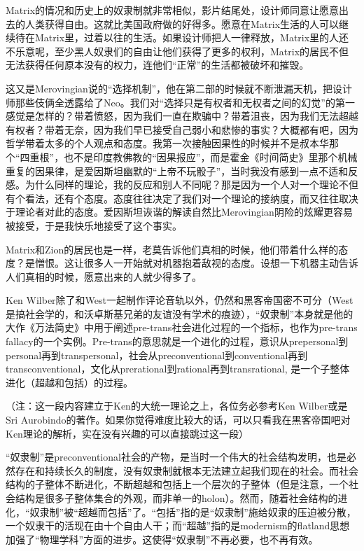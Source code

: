 \documentclass[UTF8]{ctexart}
\begin{document}
Matrix的情况和历史上的奴隶制就非常相似，影片结尾处，设计师同意让愿意出去的人类获得自由。这就比美国政府做的好得多。愿意在Matrix生活的人可以继续待在Matrix里，过着以往的生活。如果设计师把人一律释放，Matrix里的人还不乐意呢，至少黑人奴隶们的自由让他们获得了更多的权利，Matrix的居民不但无法获得任何原本没有的权力，连他们“正常”的生活都被破坏和摧毁。

这又是Merovingian说的“选择机制”，他在第二部的时候就不断泄漏天机，把设计师那些伎俩全透露给了Neo。我们对“选择只是有权者和无权者之间的幻觉”的第一感觉是怎样的？带着愤怒，因为我们一直在欺骗中？带着沮丧，因为我们无法超越有权者？带着无奈，因为我们早已接受自己弱小和悲惨的事实？大概都有吧，因为哲学带着太多的个人观点和态度。我第一次接触因果性的时候并不是叔本华那个“四重根”，也不是印度教佛教的“因果报应”，而是霍金《时间简史》里那个机械重复的因果律，是爱因斯坦幽默的“上帝不玩骰子”，当时我没有感到一点不适和反感。为什么同样的理论，我的反应和别人不同呢？那是因为一个人对一个理论不但有个看法，还有个态度。态度往往决定了我们对一个理论的接纳度，而又往往取决于理论者对此的态度。爱因斯坦诙谐的解读自然比Merovingian阴险的炫耀更容易被接受，于是我快乐地接受了这个事实。

Matrix和Zion的居民也是一样，老莫告诉他们真相的时候，他们带着什么样的态度？是憎恨。这让很多人一开始就对机器抱着敌视的态度。设想一下机器主动告诉人们真相的时候，愿意出来的人就少得多了。

Ken Wilber除了和West一起制作评论音轨以外，仍然和黑客帝国密不可分（West是搞社会学的，和沃卓斯基兄弟的友谊没有学术的痕迹），“奴隶制”本身就是他的大作《万法简史》中用于阐述pre-trans社会进化过程的一个指标，也作为pre-trans fallacy的一个实例。Pre-trans的意思就是一个进化的过程，意识从prepersonal到personal再到transpersonal，社会从preconventional到conventional再到transconventional，文化从prerational到rational再到transrational, 是一个子整体进化（超越和包括）的过程。

（注：这一段内容建立于Ken的大统一理论之上，各位务必参考Ken Wilber或是Sri Aurobindo的著作。如果你觉得难度比较大的话，可以只看我在黑客帝国吧对Ken理论的解析，实在没有兴趣的可以直接跳过这一段）

“奴隶制”是preconventional社会的产物，是当时一个伟大的社会结构发明，也是必然存在和持续长久的制度，没有奴隶制就根本无法建立起我们现在的社会。而社会结构的子整体不断进化，不断超越和包括上一个层次的子整体（但是注意，一个社会结构是很多子整体集合的外观，而非单一的holon）。然而，随着社会结构的进化，“奴隶制”被“超越而包括”了。“包括”指的是“奴隶制”施给奴隶的压迫被分散，一个奴隶干的活现在由十个自由人干；而“超越”指的是modernism的flatland思想加强了“物理学科”方面的进步。这使得“奴隶制”不再必要，也不再有效。
\end{document}
